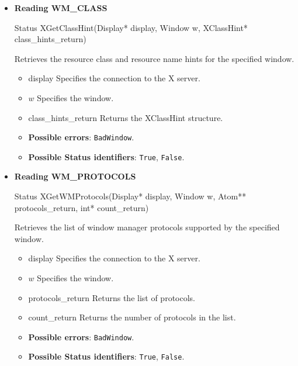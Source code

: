 \documentclass{report}
\begin{document}
\begin{itemize}
        \item \textbf{Reading WM\_CLASS}
            \bigbreak \noindent 
            \begin{cppcode}
                Status XGetClassHint(Display* display, Window w, XClassHint* class_hints_return)
            \end{cppcode}
            \bigbreak \noindent
            Retrieves the resource class and resource name hints for the specified window.
            \begin{itemize}
                \item display Specifies the connection to the X server.
                \item $w$ Specifies the window.
                \item class\_hints\_return Returns the XClassHint structure.
            \end{itemize}
            \begin{itemize}
                \item \textbf{Possible errors}: \texttt{BadWindow}.
                \item \textbf{Possible Status identifiers}: \texttt{True}, \texttt{False}.
            \end{itemize}
        \item \textbf{Reading WM\_PROTOCOLS}
            \bigbreak \noindent 
            \begin{cppcode}
                Status XGetWMProtocols(Display* display, Window w, Atom** protocols_return, int* count_return)
            \end{cppcode}
            \bigbreak \noindent
            Retrieves the list of window manager protocols supported by the specified window.
            \begin{itemize}
                \item display Specifies the connection to the X server.
                \item $w$ Specifies the window.
                \item protocols\_return Returns the list of protocols.
                \item count\_return Returns the number of protocols in the list.
            \end{itemize}
            \begin{itemize}
                \item \textbf{Possible errors}: \texttt{BadWindow}.
                \item \textbf{Possible Status identifiers}: \texttt{True}, \texttt{False}.

\end{itemize}
\end{itemize}
\end{document}
